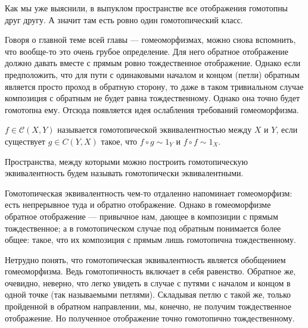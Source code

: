 \begin{Ex}
    Как мы уже выяснили, в выпуклом пространстве все отображения гомотопны друг другу. А значит там есть ровно один гомотопический класс.
\end{Ex}

Говоря о главной теме всей главы --- гомеоморфизмах, можно снова вспомнить, что вообще-то это очень грубое определение. Для него обратное отображение должно давать вместе с прямым ровно тождественное отображение. Однако если предположить, что для пути с одинаковыми началом и концом (петли) обратным является просто проход в обратную сторону, то даже в таком тривиальном случае композиция с обратным не будет равна тождественному. Однако она точно будет гомотопна ему. Отсюда появляется идея ослабления требований гомеоморфизма.
\begin{Def}
    $f\in \mathcal{C}(X,Y)$ называется гомотопической эквивалентностью между $X$ и $Y$, если существует $g\in C(Y,X)$ такое, что  $f\circ g \sim 1_Y$ и $f\circ f \sim 1_X$. 

    Пространства, между которыми можно построить гомотопическую эквивалентность будем называть гомотопически эквивалентными. 
\end{Def}


Гомотопическая эквивалентность чем-то отдаленно напоминает гомеоморфизм: есть непрерывное туда и обратно отображение. Однако в гомеоморфизме обратное отображение --- привычное нам, дающее в композиции с прямым тождественное; а в гомотопическом случае под обратным понимается более общее: такое, что их композиция с прямым лишь гомотопична тождественному. 

Нетрудно понять, что гомотопическая эквивалентность является обобщением гомеоморфизма. Ведь гомотопичность включает в себя равенство. Обратное же, очевидно, неверно, что легко увидеть в случае с путями с началом и концом в одной точке (так называемыми петлями). Складывая петлю с такой же, только пройденной в обратном направлении, мы, конечно, не получим тождественное отображение. Но полученное отображение точно гомотопично тождественному.

